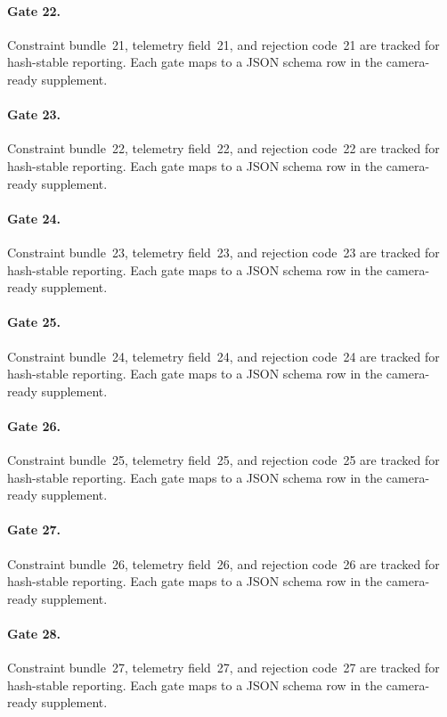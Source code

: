 \documentclass[sigconf,nonacm]{acmart}
\begin{document}
\paragraph{Gate 22.}
Constraint bundle~21, telemetry field~21, and rejection code~21 are tracked for hash-stable reporting. Each gate maps to a JSON schema row in the camera-ready supplement. %

\paragraph{Gate 23.}
Constraint bundle~22, telemetry field~22, and rejection code~22 are tracked for hash-stable reporting. Each gate maps to a JSON schema row in the camera-ready supplement. %

\paragraph{Gate 24.}
Constraint bundle~23, telemetry field~23, and rejection code~23 are tracked for hash-stable reporting. Each gate maps to a JSON schema row in the camera-ready supplement. %

\paragraph{Gate 25.}
Constraint bundle~24, telemetry field~24, and rejection code~24 are tracked for hash-stable reporting. Each gate maps to a JSON schema row in the camera-ready supplement. %

\paragraph{Gate 26.}
Constraint bundle~25, telemetry field~25, and rejection code~25 are tracked for hash-stable reporting. Each gate maps to a JSON schema row in the camera-ready supplement. %

\paragraph{Gate 27.}
Constraint bundle~26, telemetry field~26, and rejection code~26 are tracked for hash-stable reporting. Each gate maps to a JSON schema row in the camera-ready supplement. %

\paragraph{Gate 28.}
Constraint bundle~27, telemetry field~27, and rejection code~27 are tracked for hash-stable reporting. Each gate maps to a JSON schema row in the camera-ready supplement. %
\end{document}
